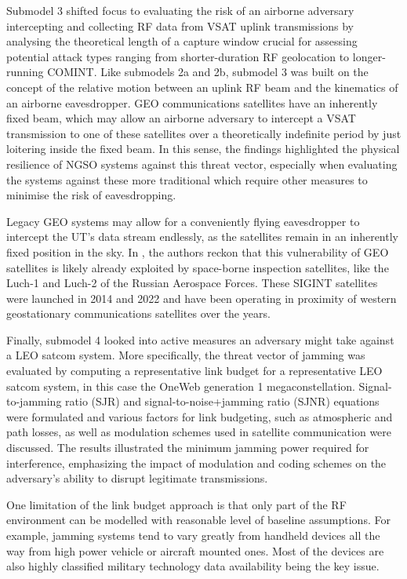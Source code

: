 \documentclass[english, 12pt, a4paper, elec, utf8, a-1b, online]{aaltothesis}
\begin{document}
Submodel 3 shifted focus to evaluating the risk of an airborne adversary intercepting and collecting RF data from VSAT uplink transmissions by analysing the theoretical length of a capture window crucial for assessing potential attack types ranging from shorter-duration RF geolocation to longer-running COMINT.
Like submodels 2a and 2b, submodel 3 was built on the concept of the relative motion between an uplink RF beam and the kinematics of an airborne eavesdropper. GEO communications satellites have an inherently fixed beam, which may allow an airborne adversary to intercept a VSAT transmission to one of these satellites over a theoretically indefinite period by just loitering inside the fixed beam.
In this sense, the findings highlighted the physical resilience of NGSO systems against this threat vector, especially when evaluating the systems against these more traditional which require other measures to minimise the risk of eavesdropping. %

Legacy GEO systems may allow for a conveniently flying eavesdropper to intercept the UT's data stream endlessly, as the satellites remain in an inherently fixed position in the sky.
In \cite{bingen2023space}, the authors reckon that this vulnerability of GEO satellites is likely already exploited by space-borne inspection satellites, like the Luch-1 and Luch-2 of the Russian Aerospace Forces.
These SIGINT satellites were launched in 2014 and 2022 and have been operating in proximity of western geostationary communications satellites over the years.

Finally, submodel 4 looked into active measures an adversary might take against a LEO satcom system. More specifically, the threat vector of jamming was evaluated by computing a representative link budget for a representative LEO satcom system, in this case the OneWeb generation 1 megaconstellation.
Signal-to-jamming ratio (SJR) and signal-to-noise+jamming ratio (SJNR) equations were formulated and various factors for link budgeting, such as atmospheric and path losses, as well as modulation schemes used in satellite communication were discussed.
The results illustrated the minimum jamming power required for interference, emphasizing the impact of modulation and coding schemes on the adversary's ability to disrupt legitimate transmissions. 

One limitation of the link budget approach is that only part of the RF environment can be modelled with reasonable level of baseline assumptions. For example, jamming systems tend to vary greatly from handheld devices all the way from high power vehicle or aircraft mounted ones. Most of the devices are also highly classified military technology data availability being the key issue.
\end{document}
